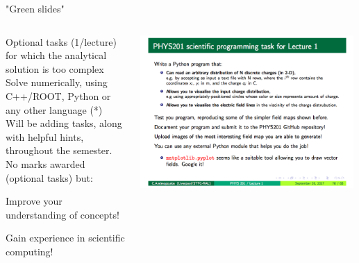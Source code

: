 \begin{frame}{"Green slides"}

\begin{columns}
  \begin{column}{0.52\textwidth}
     {\small
      Optional tasks (1/lecture) for which the analytical solution is too complex\\
      \vspace{0.2cm}
      Solve numerically, using C++/ROOT, Python or any other language (*)\\
      \vspace{0.2cm}
      Will be adding tasks, along with helpful hints, throughout the semester.\\
      \vspace{0.2cm}
      No marks awarded (optional tasks) but:
      \begin{itemize}
      {\scriptsize
        \item Improve your understanding of concepts!
        \item Gain experience in scientific computing!\\
      }
      \end{itemize}
     }
  \end{column}
  \begin{column}{0.48\textwidth}
   \begin{center}
     \includegraphics[width=0.99\textwidth]{./images/example_slides/python.png}\\
   \end{center}
  \end{column}
\end{columns}

\end{frame}

